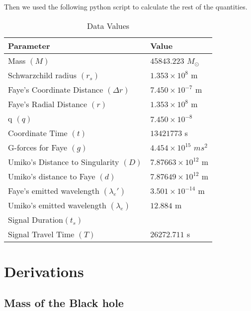 \documentclass[9pt,a4paper,twocolumn,twoside]{tau-class/tau}
\begin{document}
Then we used the following python script to calculate the rest of the quantities. 

\begin{table}[H]
  \centering
  \caption{Data Values}
  \label{tab:table}
  \begin{tabular}{ll}
      \toprule
      \textbf{Parameter} & \textbf{Value} \\
      \midrule
      Mass \((M)\) & \(45843.223\) \(M_{\odot}\)\\
      Schwarzchild radius \((r_s)\) & \(1.353 \times 10^{8}\) m\\
      Faye's Coordinate Distance \((\Delta r)\) & \(7.450 \times 10^{-7}\) m \\
      Faye's Radial Distance \((r)\) & \(1.353 \times 10^{8}\) m \\
      q \((q)\) & \(7.450 \times 10^{-8}\)\\
      Coordinate Time \((t)\) & \(13421773\) s \\
      G-forces for Faye \((g)\) & \(4.454 \times 10^{15}\) \(ms^2\)\\
      Umiko's Distance to Singularity \((D)\) & \(7.87663 \times 10^{12}\) m \\
      Umiko's distance to Faye \((d)\) & \(7.87649 \times 10^{12}\) m \\
      Faye's emitted wavelength  \((\lambda_{e}')\) & \(3.501 \times 10^{-14}\) m \\
      Umiko's emitted wavelength  \((\lambda_{e})\) & \(12.884 \) m \\
      Signal Duration\((t_s)\) & \\
      Signal Travel Time \((T)\) & \(26272.711\) s \\
      


      \bottomrule   
  \end{tabular}


\end{table}

  \newpage

  \section*{Derivations}

  \subsection*{Mass of the Black hole}
\end{document}
